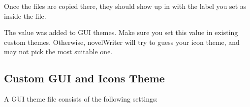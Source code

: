 \documentclass[a4paper,11pt,english]{sphinxmanual}
\begin{document}
\sphinxAtStartPar
Once the files are copied there, they should show up in  with the label you
set as  inside the file.

\sphinxAtStartPar
{}The  value was added to GUI themes. Make sure you set this value in existing custom
themes. Otherwise, novelWriter will try to guess your icon theme, and may not pick the most
suitable one.


\subsection{Custom GUI and Icons Theme}
\label{\detokenize{more_customise:custom-gui-and-icons-theme}}
\sphinxAtStartPar
A GUI theme  file consists of the following settings:
\end{document}
